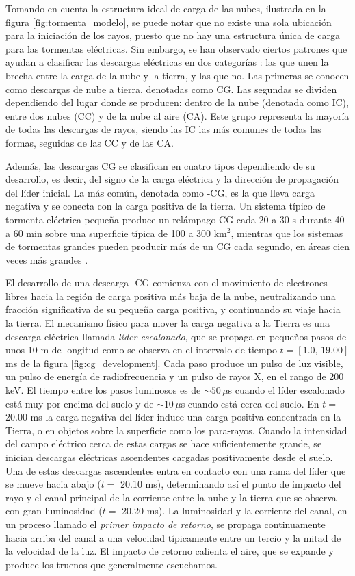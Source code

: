 \documentclass[12pt,oneside,openany,letter]{book}
\begin{document}
Tomando en cuenta la estructura ideal de carga de las nubes, ilustrada en la figura \ref{fig:tormenta_modelo}, se puede notar que no existe una sola ubicación para la iniciación de los rayos, puesto que no hay una estructura única de carga para las tormentas eléctricas. Sin embargo, se han observado ciertos patrones que ayudan a clasificar las descargas eléctricas en dos categorías \cite{DwyerUman2014}: las que unen la brecha entre la carga de la nube y la tierra, y las que no. Las primeras se conocen como descargas de nube a tierra, denotadas como CG. Las segundas se dividen dependiendo del lugar donde se producen: dentro de la nube (denotada como IC), entre dos nubes (CC) y de la nube al aire (CA). Este grupo representa la mayoría de todas las descargas de rayos, siendo las IC las más comunes de todas las formas, seguidas de las CC y de las CA. 

Adem\'as, las descargas CG se clasifican en cuatro tipos dependiendo de su desarrollo, es decir, del signo de la carga eléctrica y la dirección de propagación del l\'ider inicial. La m\'as com\'un, denotada como -CG, es la que lleva carga negativa y se conecta con la carga positiva de la tierra. Un sistema típico de tormenta eléctrica pequeña produce un relámpago CG cada 20 a 30 s durante 40 a 60 min sobre una superficie típica de 100 a 300 km$^{2}$, mientras que los sistemas de tormentas grandes pueden producir más de un CG cada segundo, en áreas cien veces más grandes \cite{DwyerUman2014}.

El desarrollo de una descarga -CG \cite{DwyerUman2014} comienza con el movimiento de electrones libres hacia la región de carga positiva más baja de la nube, neutralizando una fracción significativa de su pequeña carga positiva, y continuando su viaje hacia la tierra. El mecanismo físico para mover la carga negativa a la Tierra es una descarga eléctrica llamada \textit{líder escalonado}, que se propaga en pequeños pasos de unos 10 m de longitud como se observa en el intervalo de tiempo $t=[\text{1.0},\, \text{19.00}]$ ms de la figura \ref{fig:cg_development}. Cada paso produce un pulso de luz visible, un pulso de energía de radiofrecuencia y un pulso de rayos X, en el rango de 200 keV. El tiempo entre los pasos luminosos es de $\sim 50\,\mu$s cuando el líder escalonado está muy por encima del suelo y de $\sim 10\,\mu$s cuando está cerca del suelo. En $t=$ 20.00 ms la carga negativa del l\'ider induce una carga positiva concentrada en la Tierra, o en objetos sobre la superficie como los para-rayos. Cuando la intensidad del campo eléctrico cerca de estas cargas se hace suficientemente grande, se inician descargas eléctricas ascendentes cargadas positivamente desde el suelo. Una de estas descargas ascendentes entra en contacto con una rama del líder que se mueve hacia abajo ($t=$ 20.10 ms), determinando así el punto de impacto del rayo y el canal principal de la corriente entre la nube y la tierra que se observa con gran luminosidad ($t=$ 20.20 ms). La luminosidad y la corriente del canal, en un proceso llamado el \textit{primer impacto de retorno}, se propaga continuamente hacia arriba del canal a una velocidad típicamente entre un tercio y la mitad de la velocidad de la luz. El impacto de retorno calienta el aire, que se expande y produce los truenos que generalmente escuchamos. 
\end{document}

